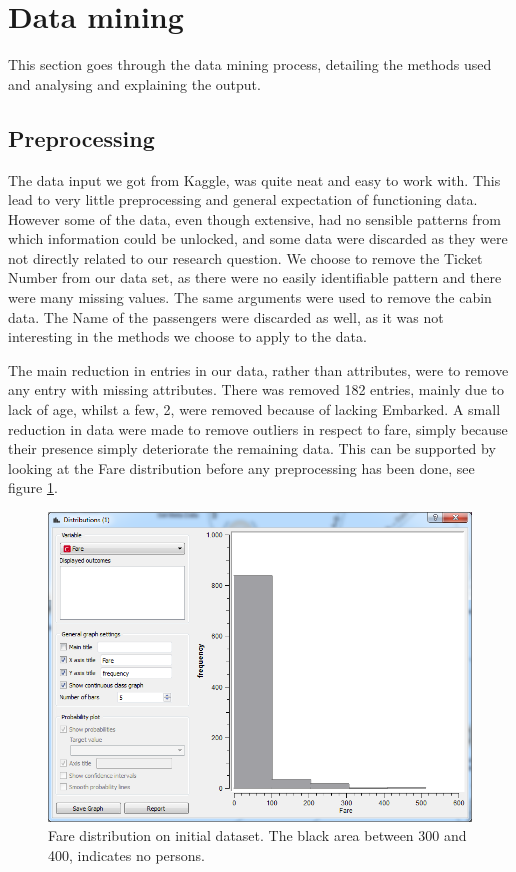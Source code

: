 \documentclass[a4paper,11pt]{article}
\begin{document}
\clearpage
\section{Data mining}
This section goes through the data mining process, detailing the methods used and analysing and explaining the output. 
\subsection{Preprocessing}
The data input we got from Kaggle\cite{kaggleData}, was quite neat and easy to work with. This lead to very little preprocessing and general expectation of functioning data. 
However some of the data, even though extensive, had no sensible patterns from which information could be unlocked, and some data were discarded as they were not directly related to our research question. 
We choose to remove the Ticket Number from our data set, as there were no easily identifiable pattern and there were many missing values. The same arguments were used to remove the cabin data. 
The Name of the passengers were discarded as well, as it was not interesting in the methods we choose to apply to the data. 

The main reduction in entries in our data, rather than attributes, were to remove any entry with missing attributes. There was removed 182 entries, mainly due to lack of age, whilst a few, 2, were removed because of lacking Embarked. 
A small reduction in data were made to remove outliers in respect to fare, simply because their presence simply deteriorate the remaining data. This can be supported by looking at the Fare distribution before any preprocessing has been done, see figure \ref{farepreprocess}.

\begin{figure}[h]
\begin{center}
	\includegraphics[scale=0.6]{FarePreprocess}
\end{center}
\caption{Fare distribution on initial dataset. The black area between 300 and 400, indicates no persons.}
\label{farepreprocess}
\end{figure}
\end{document}
